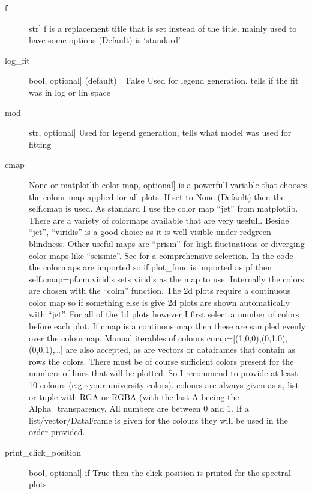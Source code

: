 \documentclass[letterpaper,10pt,english]{sphinxmanual}
\begin{document}
\begin{fulllineitems}
\begin{description}
\item[{f}] \leavevmode{[}str{]}
f is a replacement title that is set instead of the title. mainly used to have some options
(Default) is ‘standard’

\item[{log\_fit}] \leavevmode{[}bool, optional{]}
(default)= False Used for legend generation, tells if the fit was in log or lin space

\item[{mod}] \leavevmode{[}str, optional{]}
Used for legend generation, tells what model was used for fitting

\item[{cmap}] \leavevmode{[}None or matplotlib color map, optional{]}
is a powerfull variable that chooses the colour map applied for all plots. If set to
None (Default) then the self.cmap is used.
As standard I use the color map “jet” from matplotlib. There are a variety of colormaps
available that are very usefull. Beside “jet”, “viridis” is a good choice as it is well
visible under red\sphinxhyphen{}green blindness. Other useful maps are “prism” for high fluctuations
or diverging color maps like “seismic”.
See  for a comprehensive
selection. In the code the colormaps are imported so if plot\_func is imported as pf then
self.cmap=pf.cm.viridis sets viridis as the map to use. Internally the colors are chosen
with the “colm” function. The 2d plots require a continuous color map so if something
else is give 2d plots are shown automatically with “jet”. For all of the 1d plots however
I first select a number of colors before each plot. If cmap is a continous map then these
are sampled evenly over the colourmap. Manual iterables of colours
cmap={[}(1,0,0),(0,1,0),(0,0,1),…{]} are also accepted, as are vectors or dataframes that
contain as rows the colors. There must be of course sufficient colors present for
the numbers of lines that will be plotted. So I recommend to provide at least 10 colours
(e.g.\textasciitilde{}your university colors). colours are always given as a, list or tuple with RGA or RGBA
(with the last A beeing the Alpha=transparency. All numbers are between 0 and 1.
If a list/vector/DataFrame is given for the colours they will be used in the order provided.

\item[{print\_click\_position}] \leavevmode{[}bool, optional{]}
if True then the click position is printed for the spectral plots

\end{description}

\end{fulllineitems}
\end{document}
